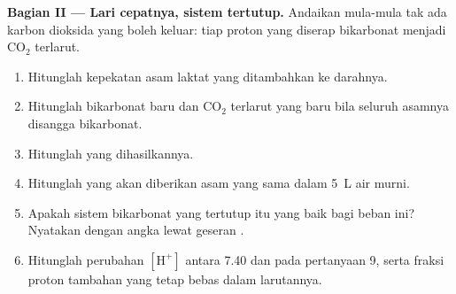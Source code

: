\begin{problem}
\medskip
\noindent\textbf{Bagian II --- Lari cepatnya, sistem tertutup.}
Andaikan mula-mula tak ada karbon dioksida yang boleh keluar: tiap
proton yang diserap bikarbonat menjadi $\mathrm{CO_2}$ terlarut.
\begin{enumerate}[resume]
  \item Hitunglah kepekatan asam laktat yang ditambahkan ke darahnya.
  \item Hitunglah bikarbonat baru dan $\mathrm{CO_2}$ terlarut yang baru
        bila seluruh asamnya disangga bikarbonat.
  \item Hitunglah  yang dihasilkannya.
  \item Hitunglah  yang akan diberikan asam yang sama dalam
        \qty{5}{L} air murni.
  \item Apakah sistem bikarbonat yang tertutup itu  yang baik
        bagi beban ini? Nyatakan dengan angka lewat geseran .
  \item Hitunglah perubahan $[\mathrm{H^+}]$ antara  7.40 dan  pada
        pertanyaan 9, serta fraksi proton tambahan yang tetap bebas
        dalam larutannya.
\end{enumerate}


\end{problem}
